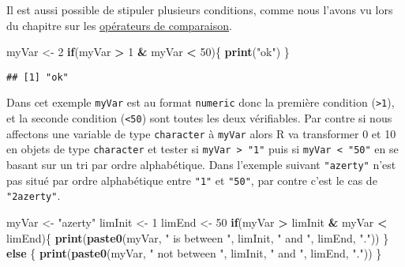\documentclass[]{book}
\newenvironment{Shaded}{\begin{snugshade}}{\end{snugshade}}
\newcommand{\KeywordTok}[1]{\textcolor[rgb]{0.13,0.29,0.53}{\textbf{#1}}}
\newcommand{\DecValTok}[1]{\textcolor[rgb]{0.00,0.00,0.81}{#1}}
\newcommand{\StringTok}[1]{\textcolor[rgb]{0.31,0.60,0.02}{#1}}
\newcommand{\ControlFlowTok}[1]{\textcolor[rgb]{0.13,0.29,0.53}{\textbf{#1}}}
\newcommand{\OperatorTok}[1]{\textcolor[rgb]{0.81,0.36,0.00}{\textbf{#1}}}
\newcommand{\NormalTok}[1]{#1}
\theoremstyle{definition}
\theoremstyle{definition}
\theoremstyle{definition}
\theoremstyle{remark}
\begin{document}
Il est aussi possible de stipuler plusieurs conditions, comme nous
l'avons vu lors du chapitre sur les
\protect\hyperlink{l011opcomp}{opérateurs de comparaison}.

\begin{Shaded}
\begin{Highlighting}[]
\NormalTok{myVar <-}\StringTok{ }\DecValTok{2}
\ControlFlowTok{if}\NormalTok{(myVar }\OperatorTok{>}\StringTok{ }\DecValTok{1} \OperatorTok{&}\StringTok{ }\NormalTok{myVar }\OperatorTok{<}\StringTok{ }\DecValTok{50}\NormalTok{)\{}
  \KeywordTok{print}\NormalTok{(}\StringTok{"ok"}\NormalTok{)}
\NormalTok{\}}
\end{Highlighting}
\end{Shaded}

\begin{verbatim}
## [1] "ok"
\end{verbatim}

Dans cet exemple \texttt{myVar} est au format \texttt{numeric} donc la
première condition (\texttt{\textgreater{}1}), et la seconde condition
(\texttt{\textless{}50}) sont toutes les deux vérifiables. Par contre si
nous affectons une variable de type \texttt{character} à \texttt{myVar}
alors R va transformer 0 et 10 en objets de type \texttt{character} et
tester si \texttt{myVar\ \textgreater{}\ "1"} puis si
\texttt{myVar\ \textless{}\ "50"} en se basant sur un tri par ordre
alphabétique. Dans l'exemple suivant \texttt{"azerty"} n'est pas situé
par ordre alphabétique entre \texttt{"1"} et \texttt{"50"}, par contre
c'est le cas de \texttt{"2azerty"}.

\begin{Shaded}
\begin{Highlighting}[]
\NormalTok{myVar <-}\StringTok{ "azerty"}
\NormalTok{limInit <-}\StringTok{ }\DecValTok{1}
\NormalTok{limEnd <-}\StringTok{ }\DecValTok{50}
\ControlFlowTok{if}\NormalTok{(myVar }\OperatorTok{>}\StringTok{ }\NormalTok{limInit }\OperatorTok{&}\StringTok{ }\NormalTok{myVar }\OperatorTok{<}\StringTok{ }\NormalTok{limEnd)\{}
  \KeywordTok{print}\NormalTok{(}\KeywordTok{paste0}\NormalTok{(myVar, }\StringTok{" is between "}\NormalTok{, limInit, }\StringTok{" and "}\NormalTok{, limEnd, }\StringTok{"."}\NormalTok{))}
\NormalTok{\} }\ControlFlowTok{else}\NormalTok{ \{}
  \KeywordTok{print}\NormalTok{(}\KeywordTok{paste0}\NormalTok{(myVar, }\StringTok{" not between "}\NormalTok{, limInit, }\StringTok{" and "}\NormalTok{, limEnd, }\StringTok{"."}\NormalTok{))}
\NormalTok{\}}
\end{Highlighting}
\end{Shaded}
\end{document}
